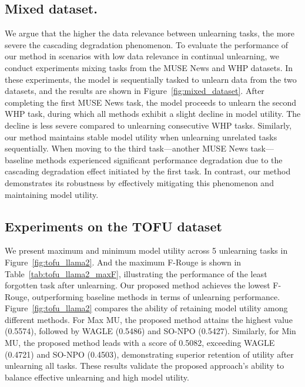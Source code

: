 \documentclass{article}
\theoremstyle{plain}
\theoremstyle{definition}
\theoremstyle{remark}
\begin{document}
\subsection{Mixed dataset.}
We argue that the higher the data relevance between unlearning tasks, the more severe the cascading degradation phenomenon. To evaluate the performance of our method in scenarios with low data relevance in continual unlearning, we conduct experiments mixing tasks from the MUSE News and WHP datasets.
In these experiments, the model is sequentially tasked to unlearn data from the two datasets, and the results are shown in Figure~\ref{fig:mixed_dataset}.
After completing the first MUSE News task, the model proceeds to unlearn the second WHP task, during which all methods exhibit a slight decline in model utility.
The decline is less severe compared to unlearning consecutive WHP tasks.
Similarly, our method maintains stable model utility when unlearning unrelated tasks sequentially.
When moving to the third task—another MUSE News task—baseline methods experienced significant performance degradation due to the cascading degradation effect initiated by the first task.
In contrast, our method demonstrates its robustness by effectively mitigating this phenomenon and maintaining model utility.


\subsection{Experiments on the TOFU dataset}
We present maximum and minimum model utility across 5 unlearning tasks in Figure~\ref{fig:tofu_llama2}.
And the maximum F-Rouge is shown in Table~\ref{tab:tofu_llama2_maxF}, illustrating the performance of the least forgotten task after unlearning.
Our proposed method achieves the lowest F-Rouge, outperforming baseline methods in terms of unlearning performance.
Figure~\ref{fig:tofu_llama2} compares the ability of retaining model utility among different methods.
For Max MU, the proposed method attains the highest value (0.5574), followed by WAGLE (0.5486) and SO-NPO (0.5427). Similarly, for Min MU, the proposed method leads with a score of 0.5082, exceeding WAGLE (0.4721) and SO-NPO (0.4503), demonstrating superior retention of utility after unlearning all tasks. These results validate the proposed approach's ability to balance effective unlearning and high model utility.
\end{document}
